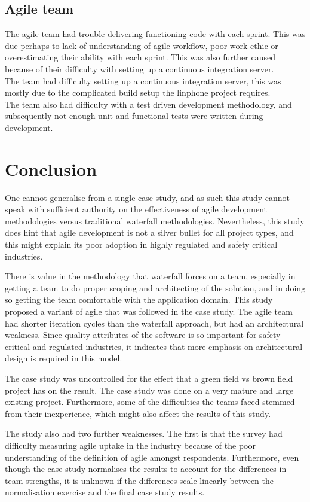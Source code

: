\documentclass{sig-alternate-05-2015}
\begin{document}
\subsection{Agile team}
The agile team had trouble delivering functioning code with each sprint. This was due perhaps to lack of understanding of agile workflow, poor work ethic or overestimating their ability with each sprint. This was also further caused because of their difficulty with setting up a continuous integration server.
\\
The team had difficulty setting up a continuous integration server, this was mostly due to the complicated build setup the linphone project requires.
\\ 
The team also had difficulty with a test driven development methodology, and subsequently not enough unit and functional tests were written during development.

\section{Conclusion}
One cannot generalise from a single case study, and as such this study cannot speak with sufficient authority on the effectiveness of agile development methodologies versus traditional waterfall methodologies. Nevertheless, this study does hint that agile development is not a silver bullet for all project types, and this might explain its poor adoption in highly regulated and safety critical industries. 

There is value in the methodology that waterfall forces on a team, especially in getting a team to do proper scoping and architecting of the solution, and in doing so getting the team comfortable with the application domain. This study proposed a variant of agile that was followed in the case study. The agile team had shorter iteration cycles than the waterfall approach, but had an architectural weakness. Since quality attributes of the software is so important for safety critical and regulated industries, it indicates that more emphasis on architectural design is required in this model. 

The case study was uncontrolled for the effect that a green field vs brown field project has on the result. The case study was done on a very mature and large existing project. Furthermore, some of the difficulties the teams faced stemmed from their inexperience, which might also affect the results of this study. 

The study also had two further weaknesses. The first is that the survey had difficulty measuring agile uptake in the industry because of the poor understanding of the definition of agile amongst respondents. Furthermore, even though the case study normalises the results to account for the differences in team strengths, it is unknown if the differences scale linearly between the normalisation exercise and the final case study results.  
\end{document}
